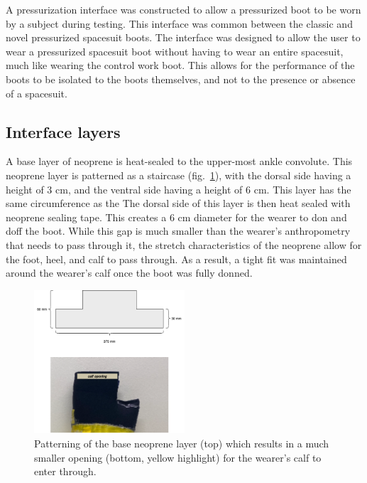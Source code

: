 \documentclass[defaultstyle,11pt]{thesis}
\begin{document}
A pressurization interface was constructed to allow a pressurized boot to be worn by a subject during testing.
This interface was common between the classic and novel pressurized spacesuit boots.
The interface was designed to allow the user to wear a pressurized spacesuit boot without having to wear an entire spacesuit, much like wearing the control work boot.
This allows for the performance of the boots to be isolated to the boots themselves, and not to the presence or absence of a spacesuit.

\hypertarget{interface-layers}{%
\subsection{Interface layers}\label{interface-layers}}

A base layer of neoprene is heat-sealed to the upper-most ankle convolute.
This neoprene layer is patterned as a staircase (fig.~\ref{fig:SA4-baseseal}), with the dorsal side having a height of 3 cm, and the ventral side having a height of 6 cm.
This layer has the same circumference as the
The dorsal side of this layer is then heat sealed with neoprene sealing tape.
This creates a 6 cm diameter for the wearer to don and doff the boot.
While this gap is much smaller than the wearer's anthropometry that needs to pass through it, the stretch characteristics of the neoprene allow for the foot, heel, and calf to pass through.
As a result, a tight fit was maintained around the wearer's calf once the boot was fully donned.

\begin{figure}
\hypertarget{fig:SA4-baseseal}{%
\centering
\includegraphics[width=0.5\textwidth,height=\textheight]{../fig/SA4/BaseSeal.png}
\caption{Patterning of the base neoprene layer (top) which results in a much smaller opening (bottom, yellow highlight) for the wearer's calf to enter through.}\label{fig:SA4-baseseal}
}
\end{figure}
\end{document}
